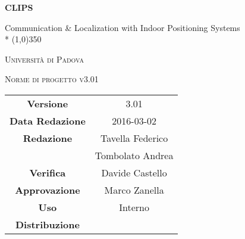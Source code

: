 \documentclass[a4paper,12pt]{article}
\author{Tavella Federico, Tombolato Andrea}
\date{04/03/2016}
\begin{document}
\begin{titlepage}
	\centering
	{\huge\bfseries CLIPS\par}
	Communication \& Localization with Indoor Positioning Systems \\*
	\line(1,0){350} \\
	{\scshape\LARGE Università di Padova \par}
	\vspace{1cm}
	{\scshape\Large Norme di progetto v3.01 \par}
	\logo
	\newpage
		\begin{tabular}{c|c}
			{\hfill \textbf{Versione}} 			& 3.01					    \\
			{\hfill\textbf{Data Redazione}} 	& 2016-03-02		 	    \\ 
			{\hfill\textbf{Redazione}} 			&  Tavella Federico			\\ 
												&  Tombolato Andrea			\\
			{\hfill\textbf{Verifica}} 			& Davide Castello	\\
			{\hfill\textbf{Approvazione}} 		&  Marco Zanella		\\
			{\hfill\textbf{Uso}} 				&  Interno					\\
			{\hfill\textbf{Distribuzione}} 		&  \leaf					\\
		\end{tabular}
	\end{titlepage}
	\newpage
	\pagestyle{myfront}
	
		\newpage
			\tableofcontents
		\newpage
			\listoffigures	
	\label{LastFrontPage}
	\newpage
	\pagestyle{mymain}
         
    \newpage
		

	\newpage
		
	
	\newpage
		
	
	\newpage
		
		
	\label{LastPage}
\end{document}
